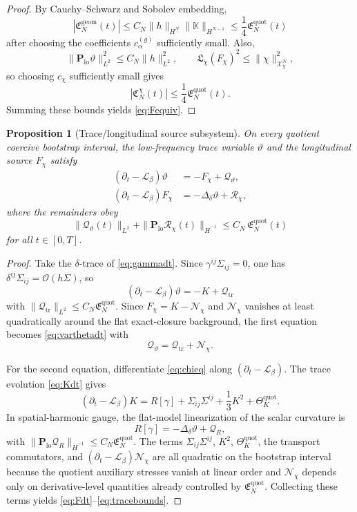 \documentclass[11pt]{article}
\newcommand{\Ell}{\mathcal{L}}
\newtheorem{proposition}{Proposition}
\begin{document}
\begin{proof}
By Cauchy--Schwarz and Sobolev embedding,
\[
|\mathfrak C_N^{\mathrm{geom}}(t)|
\le
C_N\|h\|_{H^N}\|\mathbb K\|_{H^{N-1}}
\le
\frac14\mathfrak E_N^{\mathrm{quot}}(t)
\]
after choosing the coefficients \(c_\alpha^{(g)}\) sufficiently small. Also,
\[
\|\mathbf P_{\mathrm{lo}}\vartheta\|_{L^2}^2
\le
C_N\|h\|_{L^2}^2,
\qquad
\mathfrak L_\chi(F_\chi)^2
\le
\|\chi\|_{\mathcal X_\chi^N}^2,
\]
so choosing \(c_\chi\) sufficiently small gives
\[
|\mathfrak C_N^\chi(t)|
\le
\frac14\mathfrak E_N^{\mathrm{quot}}(t).
\]
Summing these bounds yields \eqref{eq:Fequiv}.
\end{proof}

\begin{proposition}[Trace/longitudinal source subsystem]
\label{prop:trace}
On every quotient coercive bootstrap interval, the low-frequency trace variable \(\vartheta\) and the longitudinal source \(F_\chi\) satisfy
\begin{align}
(\partial_t-\Ell_\beta)\vartheta
&=
-F_\chi+\mathcal Q_\vartheta,
\label{eq:varthetadt}
\\
(\partial_t-\Ell_\beta)F_\chi
&=
-\Delta_\delta \vartheta+\mathcal R_\chi,
\label{eq:Fdt}
\end{align}
where the remainders obey
\begin{equation}
\|\mathcal Q_\vartheta(t)\|_{L^2}
+\|\mathbf P_{\mathrm{lo}}\mathcal R_\chi(t)\|_{\dot H^{-1}}
\le
C_N\,\mathfrak E_N^{\mathrm{quot}}(t)
\label{eq:tracebounds}
\end{equation}
for all \(t\in[0,T]\).
\end{proposition}

\begin{proof}
Take the \(\delta\)-trace of \eqref{eq:gammadt}. Since \(\gamma^{ij}\Sigma_{ij}=0\), one has \(\delta^{ij}\Sigma_{ij}=\mathcal O(h\Sigma)\), so
\[
(\partial_t-\Ell_\beta)\vartheta
=
-K+\mathcal Q_{\mathrm{tr}}
\]
with \(\|\mathcal Q_{\mathrm{tr}}\|_{L^2}\le C_N\mathfrak E_N^{\mathrm{quot}}\). Since \(F_\chi=K-\mathcal N_\chi\) and \(\mathcal N_\chi\) vanishes at least quadratically around the flat exact-closure background, the first equation becomes \eqref{eq:varthetadt} with
\[
\mathcal Q_\vartheta=\mathcal Q_{\mathrm{tr}}+\mathcal N_\chi.
\]

For the second equation, differentiate \eqref{eq:chieq} along \((\partial_t-\Ell_\beta)\). The trace evolution \eqref{eq:Kdt} gives
\[
(\partial_t-\Ell_\beta)K
=
R[\gamma]+\Sigma_{ij}\Sigma^{ij}+\frac13K^2+\Theta_K^{\mathrm{quot}}.
\]
In spatial-harmonic gauge, the flat-model linearization of the scalar curvature is
\[
R[\gamma]=-\Delta_\delta\vartheta+\mathcal Q_R,
\]
with \(\|\mathbf P_{\mathrm{lo}}\mathcal Q_R\|_{\dot H^{-1}}\le C_N\mathfrak E_N^{\mathrm{quot}}\). The terms \(\Sigma_{ij}\Sigma^{ij}\), \(K^2\), \(\Theta_K^{\mathrm{quot}}\), the transport commutators, and \((\partial_t-\Ell_\beta)\mathcal N_\chi\) are all quadratic on the bootstrap interval because the quotient auxiliary stresses vanish at linear order and \(\mathcal N_\chi\) depends only on derivative-level quantities already controlled by \(\mathfrak E_N^{\mathrm{quot}}\). Collecting these terms yields \eqref{eq:Fdt}--\eqref{eq:tracebounds}.
\end{proof}
\end{document}
